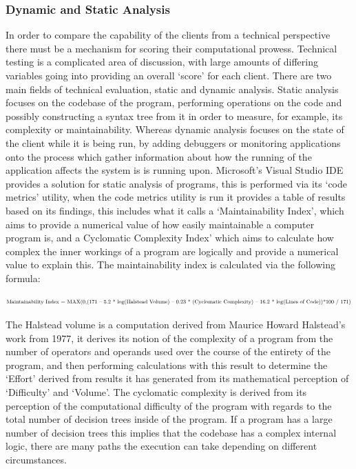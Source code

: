 \documentclass{article}
\begin{document}
	\subsubsection{Dynamic and Static Analysis}
	In order to compare the capability of the clients from a technical perspective there must be a mechanism for scoring their computational prowess. Technical testing is a complicated area of discussion, with large amounts of differing variables going into providing an overall ‘score’ for each client. There are two main fields of technical evaluation, static and dynamic analysis. Static analysis focuses on the codebase of the program, performing operations on the code and possibly constructing a syntax tree from it in order to measure, for example, its complexity or maintainability. Whereas dynamic analysis focuses on the state of the client while it is being run, by adding debuggers or monitoring applications onto the process which gather information about how the running of the application affects the system is is running upon. Microsoft’s Visual Studio IDE provides a solution for static analysis of programs, this is performed via its ‘code metrics’ utility, when the code metrics utility is run it provides a table of results based on its findings, this includes what it calls a ‘Maintainability Index’, which aims to provide a numerical value of how easily maintainable a computer program is, and a Cyclomatic Complexity Index’ which aims to calculate how complex the inner workings of a program are logically and provide a numerical value to explain this. The maintainability index is calculated via the following formula: 
	\begin{center}
	\begin{equation}
	\resizebox{1.1\hsize}{!}{Maintainability Index = MAX(0,(171 – 5.2 * log(Halstead Volume) – 0.23 * (Cyclomatic Complexity) – 16.2 * log(Lines of Code))*100 / 171)}
	\end{equation}
	\end{center}
	
	The Halstead volume is a computation derived from Maurice Howard Halstead’s work from 1977, it derives its notion of the complexity of a program from the number of operators and operands used over the course of the entirety of the program, and then performing calculations with this result to determine the ‘Effort’ derived from results it has generated from its mathematical perception of ‘Difficulty’ and ‘Volume’. The cyclomatic complexity is derived from its perception of the computational difficulty of the program with regards to the total number of decision trees inside of the program. If a program has a large number of decision trees this implies that the codebase has a complex internal logic, there are many paths the execution can take depending on different circumstances.
	
\end{document}
